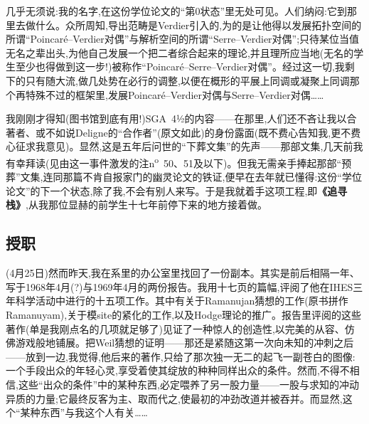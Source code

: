 几乎无须说:我的名字,在这份学位论文的“第0状态”里无处可见。人们纳闷:它到那里去做什么。众所周知,导出范畴是Verdier引入的,为的是让他得以发展拓扑空间的所谓“Poincaré--Verdier对偶”与解析空间的所谓“Serre--Verdier对偶”;只待某位当值无名之辈出头,为他自己发展一个把二者综合起来的理论,并且理所应当地(无名的学生至少也得做到这一步!)被称作“Poincaré--Serre--Verdier对偶”。经过这一切,我剩下的只有随大流,做几处势在必行的调整,以便在概形的平展上同调或凝聚上同调那个再特殊不过的框架里,发展Poincaré--Verdier对偶与Serre--Verdier对偶……

我刚刚才得知(图书馆到底有用!)SGA~4½的内容——在那里,人们还不吝让我以合著者、或不如说Deligne的“合作者”(原文如此)的身份露面(既不费心告知我,更不费心征求我意见)。显然,这是五年后问世的“下葬文集”的先声——那部文集,几天前我有幸拜读(见由这一事件激发的注n\textsuperscript{o}~50、51及以下)。但我无需亲手捧起那部“预葬”文集,连同那篇不肯自报家门的幽灵论文的铁证,便早在去年就已懂得:这份“学位论文”的下一个状态,除了我,不会有别人来写。于是我就着手这项工程,即\textbf{《追寻栈》}\dmark{},从我那位显赫的前学生十七年前停下来的地方接着做。

\subsection{授职}


(4月25日)然而昨天,我在系里的办公室里找回了一份副本。其实是前后相隔一年、写于1968年4月(?)与1969年4月的两份报告。我用十七页的篇幅,评阅了他在IHES三年科学活动中进行的十五项工作。其中有关于Ramanujan猜想的工作(原书拼作Ramanuyam),关于模site的紧化的工作,以及Hodge理论的推广。报告里评阅的这些著作(单是我刚点名的几项就足够了)见证了一种惊人的创造性,以完美的从容、仿佛游戏般地铺展。把Weil猜想的证明——那还是紧随这第一次向未知的冲刺之后——放到一边,我觉得,他后来的著作,只给了那次独一无二的起飞一副苍白的图像:一个手段出众的年轻心灵,享受着使其绽放的种种同样出众的条件。然而,不得不相信,这些“出众的条件”中的某种东西,必定喂养了另一股力量——一股与求知的冲动异质的力量;它最终反客为主、取而代之,使最初的冲劲改道并被吞并。而显然,这个“某种东西”与我这个人有关……

